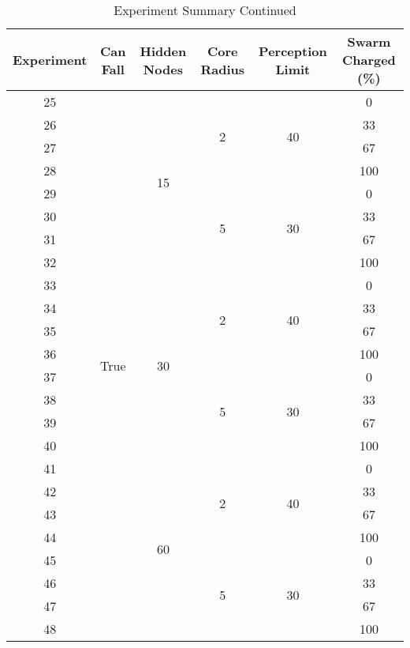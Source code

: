 \begin{table}
  \centering
  \begin{tabular}{|c|c|c|c|c|c|}
    \hline
    Experiment & Can Fall & Hidden Nodes & Core Radius & Perception Limit & Swarm Charged (\%) \\
    \hline 
    25 & \multirow{ 24}{*}{True} & \multirow{ 8}{*}{15}  & \multirow{ 4}{*}{2} & \multirow{ 4}{*}{40} & 0 \\
    26 & & & & & 33\\
    27 & & & & & 67\\
    28 & & & & & 100\\ \cline{4-6}
    29 &  &   & \multirow{ 4}{*}{5} & \multirow{ 4}{*}{30} & 0 \\
    30 & & & & & 33\\
    31 & & & & & 67\\
    32 & & & & & 100\\ \cline{3-6}
    33 &  & \multirow{ 8}{*}{30}  & \multirow{ 4}{*}{2} & \multirow{ 4}{*}{40} & 0 \\
    34 & & & & & 33\\
    35 & & & & & 67\\
    36 & & & & & 100\\ \cline{4-6}
    37 &  &   & \multirow{ 4}{*}{5} & \multirow{ 4}{*}{30} & 0 \\
    38 & & & & & 33\\
    39 & & & & & 67\\
    40 & & & & & 100\\ \cline{3-6}
    41 &  & \multirow{ 8}{*}{60}  & \multirow{ 4}{*}{2} & \multirow{ 4}{*}{40} & 0 \\
    42 & & & & & 33\\
    43 & & & & & 67\\
    44 & & & & & 100\\ \cline{4-6}
    45 &  &   & \multirow{ 4}{*}{5} & \multirow{ 4}{*}{30} & 0 \\
    46 & & & & & 33\\
    47 & & & & & 67\\
    48 & & & & & 100\\
    \hline
  \end{tabular}
  \caption{Experiment Summary Continued}
  \label{tab:experiment-labels-2}
\end{table}